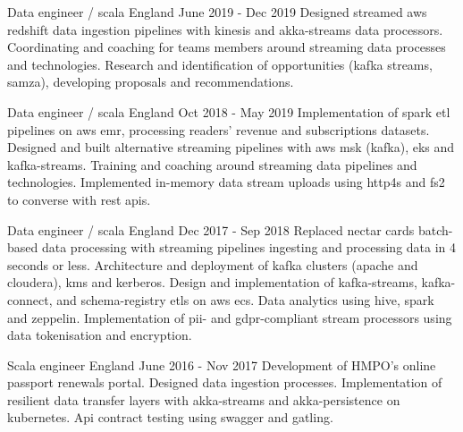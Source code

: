 \begin{cventries}
  \cventry
    {Data engineer / scala} %
    {} %
    {England} %
    {June 2019 - Dec 2019} %
    {}
    {
      Designed streamed aws redshift data ingestion pipelines with kinesis and akka-streams data processors. Coordinating and coaching for teams members
      around streaming data processes and technologies.
      Research and identification of opportunities (kafka streams, samza), developing proposals and recommendations.
    }

  \cventry
    {Data engineer / scala} %
    {} %
    {England} %
    {Oct 2018 - May 2019} %
    {} %
    {
Implementation of spark etl pipelines on aws emr, processing readers' revenue and subscriptions datasets. 
Designed and built alternative streaming pipelines with aws msk (kafka), eks and kafka-streams. Training and coaching around streaming data pipelines and technologies.
Implemented in-memory data stream uploads using http4s and fs2 to converse with rest apis.
    }

  \cventry
    {Data engineer / scala} %
    {} %
    {England} %
    {Dec 2017 - Sep 2018} %
    {} %
    {
Replaced nectar cards batch-based data processing with streaming pipelines ingesting and processing data in 4 seconds or less.
Architecture and deployment of kafka clusters (apache and cloudera), kms and kerberos. 
Design and implementation of kafka-streams, kafka-connect, and schema-registry etls on aws ecs. Data analytics using hive, spark and zeppelin.
Implementation of pii- and gdpr-compliant stream processors using data tokenisation and encryption.
    }

  \cventry
    {Scala engineer} %
    {} %
    {England} %
    {June 2016 - Nov 2017} %
    {} %
    {
Development of HMPO's online passport renewals portal. Designed data ingestion processes.
Implementation of resilient data transfer layers with akka-streams and akka-persistence on kubernetes.
Api contract testing using swagger and gatling.
    }


\end{cventries}
